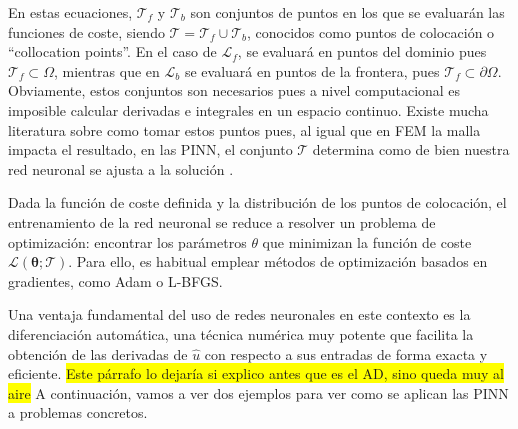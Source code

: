 \documentclass[a4paper,11pt,spanish, twoside, leqno]{tfg-uam}
\theoremstyle{definition}
\begin{document}
En estas ecuaciones, $\mathcal{T}_f$ y $\mathcal{T}_b$ son conjuntos de puntos en los que se evaluarán las funciones de coste, siendo $\mathcal{T}= \mathcal{T}_f\cup\mathcal{T}_b$, conocidos como puntos de colocación o ``collocation points''. En el caso de $\mathcal{L}_f$, se evaluará en puntos del dominio pues $\mathcal{T}_f\subset\Omega$, mientras que en $\mathcal{L}_b$ se evaluará en puntos de la frontera, pues $\mathcal{T}_f\subset\partial\Omega$. Obviamente, estos conjuntos son necesarios pues a nivel computacional es imposible calcular derivadas e integrales en un espacio continuo. Existe mucha literatura sobre como tomar estos puntos pues, al igual que en FEM la malla impacta el resultado, en las PINN, el conjunto $\mathcal{T}$ determina como de bien nuestra red neuronal se ajusta a la solución \cite{münzer2022curriculumtrainingbasedstrategydistributingcollocation}\cite{aikawa2024improving}\cite{matsubara2023goodlatticetrainingphysicsinformed}\cite{subramanian2022adaptiveselfsupervisionalgorithmsphysicsinformed}\cite{hou2023enhancing}.  

Dada la función de coste definida y la distribución de los puntos de colocación, el entrenamiento de la red neuronal se reduce a resolver un problema de optimización: encontrar los parámetros $\theta$ que minimizan la función de coste $\mathcal{L}(\boldsymbol{\theta}; \mathcal{T})$. Para ello, es habitual emplear métodos de optimización basados en gradientes, como Adam o L-BFGS. 

Una ventaja fundamental del uso de redes neuronales en este contexto es la diferenciación automática, una técnica numérica muy potente que facilita la obtención de las derivadas de $\hat{u}$ con respecto a sus entradas de forma exacta y eficiente.
\colorbox{yellow}{Este párrafo lo dejaría si explico antes que es el AD, sino queda muy al aire}
A continuación, vamos a ver dos ejemplos para ver como se aplican las PINN a problemas concretos.
\end{document}
